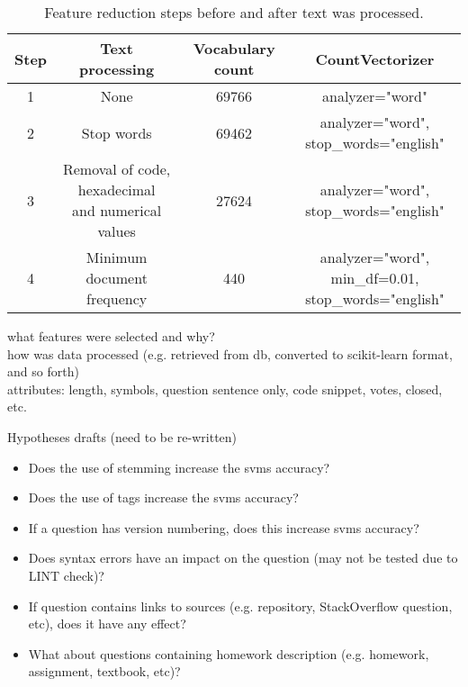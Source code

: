\begin{table}[tbp]
	\centering
	\begin{tabular}{| c | c | c | c |}
		\hline
		Step & Text processing  & Vocabulary count & CountVectorizer  \\ \hline
		1 	& None 									& 69766 	& analyzer="word" \\ \hline
		2 	& Stop words 							& 69462 	& 
			\shortstack{analyzer="word", \\ stop\_words="english"} \\ \hline
		3 	& \shortstack{Removal of code, 
			hexadecimal \\ and numerical values} 	& 27624 	& 
			\shortstack{analyzer="word", \\ stop\_words="english"} \\ \hline
		4 	& Minimum document frequency 			& 440 		& 
				\shortstack{analyzer="word", min\_df=0.01, \\ stop\_words="english"} \\ \hline
	\end{tabular}
	\caption{Feature reduction steps before and after text was processed.}
	\label{tab:feature_reduction}
\end{table}

what features were selected and why? \\
how was data processed (e.g. retrieved from db, converted to scikit-learn format, and so forth) \\
attributes: length, symbols, question sentence only, code snippet, votes, closed, etc.

\newpage
Hypotheses drafts (need to be re-written)
\begin{itemize}
	\item Does the use of stemming increase the \gls{svm}s accuracy?
	\item Does the use of tags increase the \gls{svm}s accuracy?
	\item If a question has version numbering, does this increase \gls{svm}s accuracy?
	\item Does syntax errors have an impact on the question (may not be tested due to LINT check)?
	\item If question contains links to sources (e.g. repository, StackOverflow question, etc), does it have any effect?
	\item What about questions containing homework description (e.g. homework, assignment, textbook, etc)?
\end{itemize}
